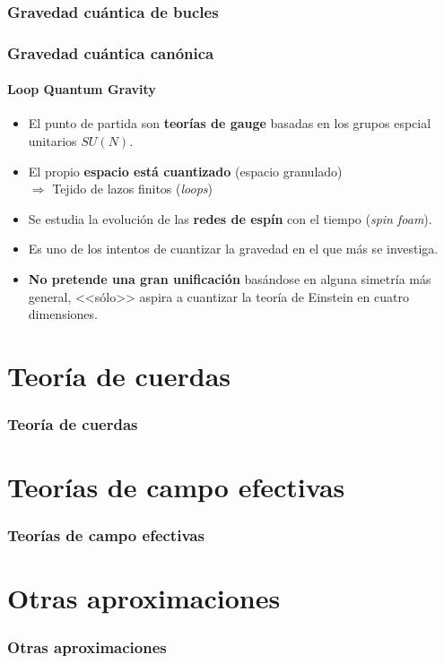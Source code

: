 \documentclass{beamer}
\begin{document}
\subsubsection{Gravedad cuántica de bucles}
\begin{frame}
\frametitle{Gravedad cuántica canónica}
\framesubtitle{Loop Quantum Gravity}
\begin{itemize}
 \item El punto de partida son \textbf{teorías de gauge} basadas en los grupos espcial unitarios $SU(N)$.
 \item El propio \textbf{espacio está cuantizado} (espacio granulado)\\$\Rightarrow$ Tejido de lazos finitos (\emph{loops})
 \item Se estudia la evolución de las \textbf{redes de espín} con el tiempo (\emph{spin foam}).
 \item Es uno de los intentos de cuantizar la gravedad en el que más se investiga.
 \item \textbf{No pretende una gran unificación} basándose en alguna simetría más general, <<sólo>> aspira a cuantizar la teoría de Einstein en cuatro dimensiones.
\end{itemize}
\end{frame}

\section{Teoría de cuerdas}
\begin{frame}
\frametitle{Teoría de cuerdas}

\end{frame}

\section{Teorías de campo efectivas}
\begin{frame}
\frametitle{Teorías de campo efectivas}

\end{frame}

\section{Otras aproximaciones}
\begin{frame}
\frametitle{Otras aproximaciones}

\end{frame}
\end{document}
